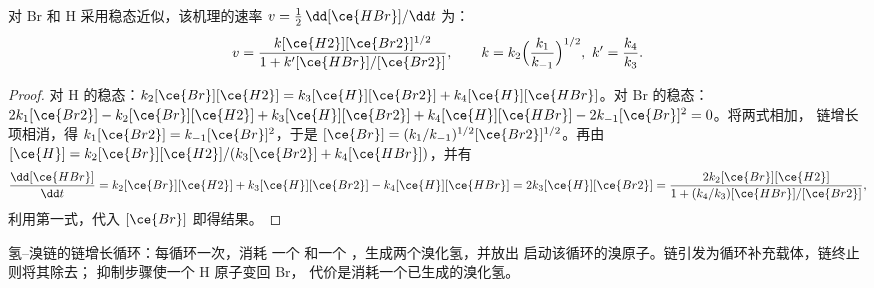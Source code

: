 \begin{theorem}[氢–溴速率定律]\label{thm:b3:complex-kinetics:hbr}
对 Br 和 H 采用稳态近似，该机理的速率 $v = \frac12\,\dd[\ce{HBr}]/\dd t$
为：
\[
  v = \frac{k[\ce{H2}][\ce{Br2}]^{1/2}}{1 + k'[\ce{HBr}]/[\ce{Br2}]},
  \qquad k = k_2\Bigl(\frac{k_1}{k_{-1}}\Bigr)^{1/2},\ k' = \frac{k_4}{k_3}.
\]
\end{theorem}

\begin{proof}
对 H 的稳态：$k_2[\ce{Br}][\ce{H2}] = k_3[\ce{H}][\ce{Br2}] + k_4[\ce{H}][\ce{HBr}]$。对 Br 的稳态：
$2k_1[\ce{Br2}] - k_2[\ce{Br}][\ce{H2}] + k_3[\ce{H}][\ce{Br2}] + k_4[\ce{H}][\ce{HBr}] - 2k_{-1}[\ce{Br}]^2 = 0$。将两式相加，
链增长项相消，得 $k_1[\ce{Br2}] = k_{-1}[\ce{Br}]^2$，于是 $[\ce{Br}] =
(k_1/k_{-1})^{1/2}[\ce{Br2}]^{1/2}$。再由 $[\ce{H}] = k_2[\ce{Br}][\ce{H2}]/(k_3[\ce{Br2}] + k_4[\ce{HBr}])$，并有
\[
  \frac{\dd[\ce{HBr}]}{\dd t} = k_2[\ce{Br}][\ce{H2}] + k_3[\ce{H}][\ce{Br2}] - k_4[\ce{H}][\ce{HBr}] = 2k_3[\ce{H}][\ce{Br2}]
  = \frac{2k_2[\ce{Br}][\ce{H2}]}{1 + (k_4/k_3)[\ce{HBr}]/[\ce{Br2}]},
\]
利用第一式，代入 $[\ce{Br}]$ 即得结果。
\end{proof}

\begin{omfigure}

{\small 氢–溴链的链增长循环：每循环一次，消耗
一个  和一个 ，生成两个溴化氢，并放出
启动该循环的溴原子。链引发为循环补充载体，链终止则将其除去；
抑制步骤使一个 H 原子变回 Br，
代价是消耗一个已生成的溴化氢。}
\end{omfigure}

